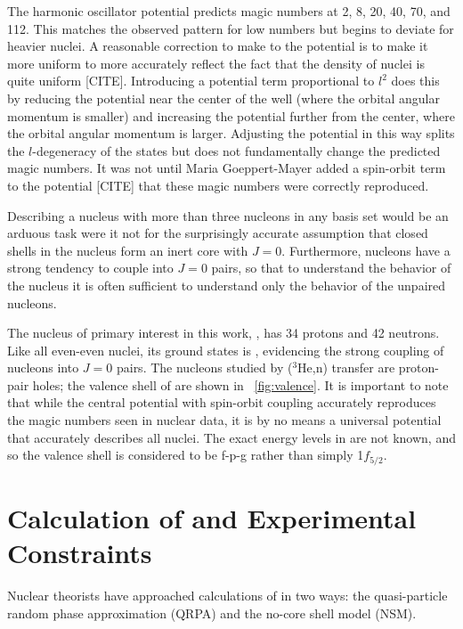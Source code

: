 The harmonic oscillator potential predicts magic numbers at 2, 8, 20, 40, 70, and 112.  This matches the observed pattern for low numbers but begins to deviate for heavier nuclei.  A reasonable correction to make to the potential is to make it more uniform to more accurately reflect the fact that the density of nuclei is quite uniform [CITE].  Introducing a potential term proportional to $l^2$ does this by reducing the potential near the center of the well (where the orbital angular momentum is smaller) and increasing the potential further from the center, where the orbital angular momentum is larger.  Adjusting the potential in this way splits the $l$-degeneracy of the states but does not fundamentally change the predicted magic numbers.  It was not until Maria Goeppert-Mayer added a spin-orbit term to the potential [CITE] that these magic numbers were correctly reproduced.  

Describing a nucleus with more than three nucleons in any basis set would be an arduous task were it not for the surprisingly accurate assumption that closed shells in the nucleus form an inert core with $J=0$.  Furthermore, nucleons have a strong tendency to couple into $J=0$ pairs, so that to understand the behavior of the nucleus it is often sufficient to understand only the behavior of the unpaired nucleons.

The nucleus of primary interest in this work, , has 34 protons and 42 neutrons.  Like all even-even nuclei, its ground states is \zp, evidencing the strong coupling of nucleons into $J=0$ pairs.  The nucleons studied by ($^3$He,n) transfer are proton-pair holes; the valence shell of \GeTargets are shown in {\fig}~\ref{fig:valence}.  It is important to note that while the central potential with spin-orbit coupling accurately reproduces the magic numbers seen in nuclear data, it is by no means a universal potential that accurately describes all nuclei.  The exact energy levels in \GeTargets are not known, and so the valence shell is considered to be f-p-g rather than simply 1$f_{5/2}$.

\section{Calculation of \NME and Experimental Constraints}

Nuclear theorists have approached calculations of \NME in two ways: the quasi-particle random phase approximation (QRPA) and the no-core shell model (NSM).

